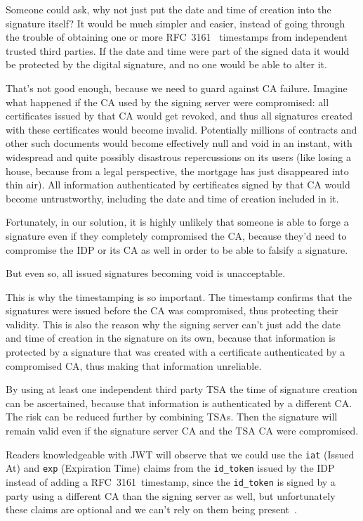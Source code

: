 Someone could ask, why not just put the date and time of creation into the signature itself?
It would be much simpler and easier,
instead of going through the trouble of obtaining one or more RFC~3161~\cite{rfc3161} timestamps
from independent trusted third parties.
If the date and time were part of the signed data it would be protected by the digital signature,
and no one would be able to alter it.

That's not good enough, because we need to guard against \gls{CA} failure.
Imagine what happened if the \gls{CA} used by the signing server were compromised:
all certificates issued by that \gls{CA} would get revoked,
and thus all signatures created with these certificates would become invalid.
Potentially millions of contracts and other such documents would become effectively null and void in an instant,
with widespread and quite possibly disastrous repercussions on its users
(like losing a house, because from a legal perspective, the mortgage has just disappeared into thin air).
All information authenticated by certificates signed by that \gls{CA} would become untrustworthy,
including the date and time of creation included in it.

Fortunately, in our solution, it is highly unlikely that someone is able to forge a signature even if they
completely compromised the \gls{CA}, because they'd need to compromise the \gls{IDP} or its \gls{CA} as well
in order to be able to falsify a signature.

But even so, all issued signatures becoming void is unacceptable.

This is why the timestamping is so important.
The timestamp confirms that the signatures were issued before the \gls{CA} was compromised,
thus protecting their validity.
This is also the reason why the signing server can't just add the date and time of creation in the signature on its own,
because that information is protected by a signature that was created with a certificate authenticated
by a compromised \gls{CA}, thus making that information unreliable.

By using at least one independent third party \gls{TSA} the time of signature creation can be ascertained,
because that information is authenticated by a different \gls{CA}.
The risk can be reduced further by combining \gls{TSA}s.
Then the signature will remain valid even if the signature server \gls{CA} and the \gls{TSA} \gls{CA} were compromised.

Readers knowledgeable with \gls{JWT} will observe that we could use the \texttt{iat} (Issued At) and \texttt{exp} (Expiration Time)
claims from the \texttt{id\_token} issued by the \gls{IDP} instead of adding a RFC~3161~timestamp,
since the \texttt{id\_token} is signed by a party using a different \gls{CA} than the signing server as well,
but unfortunately these claims are optional and we can't rely on them being present~\cite[Sections 4.1.4 and 4.1.6]{rfc7519}.

